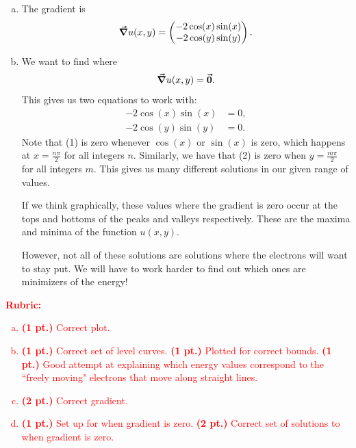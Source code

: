 \documentclass[12pt]{article} %
\begin{document}
\begin{solution}
\begin{enumerate}[(a)]
    \item The gradient is
    \[
    \boldsymbol{\vec{\nabla}} u(x,y) = \begin{pmatrix} -2\cos(x)\sin(x) \\ -2\cos(y)\sin(y) \end{pmatrix}.
    \]
    \item We want to find where
    \[
    \boldsymbol{\vec{\nabla}} u(x,y) = \boldsymbol{\vec{0}}.
    \]
    This gives us two equations to work with:
    \begin{align}
        -2\cos(x)\sin(x) &= 0,\\
        -2\cos(y)\sin(y) &= 0.
    \end{align}
    Note that (1) is zero whenever $\cos(x)$ or $\sin(x)$ is zero, which happens at $x=\frac{n\pi}{2}$ for all integers $n$. Similarly, we have that (2) is zero when $y=\frac{m\pi}{2}$ for all integers $m$.  This gives us many different solutions in our given range of values.

    If we think graphically, these values where the gradient is zero occur at the tops and bottoms of the peaks and valleys respectively.  These are the maxima and minima of the function $u(x,y)$.

    However, not all of these solutions are solutions where the electrons will want to stay put.  We will have to work harder to find out which ones are minimizers of the energy!
\end{enumerate}
\end{solution}
\textcolor{red}{
\noindent \textbf{Rubric:}}
\textcolor{red}{
\begin{enumerate}[(a)]
\item \textbf{(1 pt.)} Correct plot.
\item \textbf{(1 pt.)} Correct set of level curves. \textbf{(1 pt.)} Plotted for correct bounds. \textbf{(1 pt.)} Good attempt at explaining which energy values correspond to the ``freely moving" electrons that move along straight lines.
\item \textbf{(2 pt.)} Correct gradient.
\item \textbf{(1 pt.)} Set up for when gradient is zero. \textbf{(2 pt.)} Correct set of solutions to when gradient is zero.
\end{enumerate}
}
\end{document}
